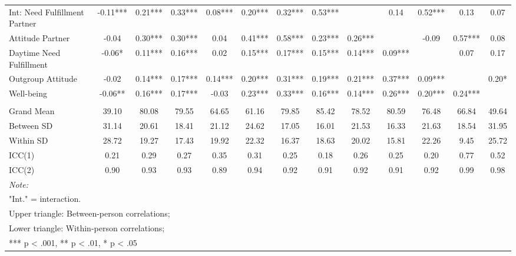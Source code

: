 \begin{sidewaystable*}[!hbtp]
{\begin{tabular}[t]{lcccccccccccc}
\hspace{1em}Int: Need Fulfillment Partner & -0.11*** & 0.21*** & 0.33*** & 0.08*** & 0.20*** & 0.32*** & 0.53*** &  & 0.14 & 0.52*** & 0.13 & 0.07\\
\hspace{1em}Attitude Partner & -0.04 & 0.30*** & 0.30*** & 0.04 & 0.41*** & 0.58*** & 0.23*** & 0.26*** &  & -0.09 & 0.57*** & 0.08\\
\hspace{1em}Daytime Need Fulfillment & -0.06* & 0.11*** & 0.16*** & 0.02 & 0.15*** & 0.17*** & 0.15*** & 0.14*** & 0.09*** &  & 0.07 & 0.17\\
\hspace{1em}Outgroup Attitude & -0.02 & 0.14*** & 0.17*** & 0.14*** & 0.20*** & 0.31*** & 0.19*** & 0.21*** & 0.37*** & 0.09*** &  & 0.20*\\
\hspace{1em}Well-being & -0.06** & 0.16*** & 0.17*** & -0.03 & 0.23*** & 0.33*** & 0.16*** & 0.14*** & 0.26*** & 0.20*** & 0.24*** & \\
\addlinespace[0.3em]
\multicolumn{13}{l}{\textbf{Descriptives}}\\
\hspace{1em}Grand Mean & 39.10 & 80.08 & 79.55 & 64.65 & 61.16 & 79.85 & 85.42 & 78.52 & 80.59 & 76.48 & 66.84 & 49.64\\
\hspace{1em}Between SD & 31.14 & 20.61 & 18.41 & 21.12 & 24.62 & 17.05 & 16.01 & 21.53 & 16.33 & 21.63 & 18.54 & 31.95\\
\hspace{1em}Within SD & 28.72 & 19.27 & 17.43 & 19.92 & 22.32 & 16.37 & 18.63 & 20.02 & 15.81 & 22.26 & 9.45 & 25.72\\
\hspace{1em}ICC(1) & 0.21 & 0.29 & 0.27 & 0.35 & 0.31 & 0.25 & 0.18 & 0.26 & 0.25 & 0.20 & 0.77 & 0.52\\
\hspace{1em}ICC(2) & 0.90 & 0.93 & 0.93 & 0.89 & 0.94 & 0.92 & 0.91 & 0.92 & 0.91 & 0.92 & 0.99 & 0.98\\
\bottomrule
\multicolumn{13}{l}{\rule{0pt}{1em}\textit{Note: }}\\
\multicolumn{13}{l}{\rule{0pt}{1em}"Int." = interaction.}\\
\multicolumn{13}{l}{\rule{0pt}{1em}Upper triangle: Between-person correlations;}\\
\multicolumn{13}{l}{\rule{0pt}{1em}Lower triangle: Within-person correlations;}\\
\multicolumn{13}{l}{\rule{0pt}{1em}*** p < .001, ** p < .01,  * p < .05}\\
\end{tabular}}
\end{sidewaystable*}
